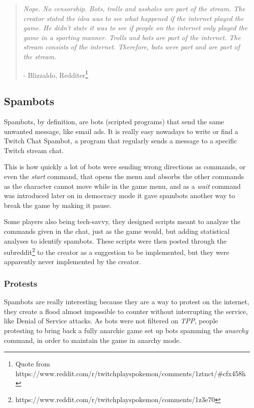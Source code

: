 \documentclass[a4paper]{article}
\begin{document}
\begin{quote}
\textit{
Nope. No censorship. Bots, trolls and assholes are part of the stream.
The creator stated the idea was to see what happened if the internet played the game. He didn't state it was to see if people on the internet only played the game in a sporting manner. Trolls and bots are part of the internet. The stream consists of the internet. Therefore, bots were part and are part of the stream.}\par
\hfill\hfill- Blizzaldo, Redditer\footnote{Quote from https://www.reddit.com/r/twitchplayspokemon/comments/1ztnct/\#cfx458h}
\end{quote}

\subsection{Spambots}

Spambots, by definition, are bots (scripted programs) that send the same unwanted message, like email ads. It is really easy nowadays to write or find a Twitch Chat Spambot, a program that regularly sends a message to a specific Twitch stream chat.

This is how quickly a lot of bots were sending wrong directions as commands, or even the \textit{start} command, that opens the menu and absorbs the other commands as the character cannot move while in the game menu, and as a \textit{wait} command was introduced later on in democracy mode it gave spambots another way to break the game by making it pause.

Some players also being tech-savvy, they designed scripts meant to analyze the commands given in the chat, just as the game would, but adding statistical analyses to identify spambots. These scripts were then posted through the subreddit\footnote{https://www.reddit.com/r/twitchplayspokemon/comments/1z3e70} to the creator as a suggestion to be implemented, but they were apparently never implemented by the creator.

\subsubsection{Protests}

Spambots are really interesting because they are a way to protest on the internet, they create a flood almost impossible to counter without interrupting the service, like Denial of Service attacks. As bots were not filtered on \textit{TPP}, people protesting to bring back a fully anarchic game set up bots spamming the \textit{anarchy} command, in order to maintain the game in anarchy mode.
\end{document}
